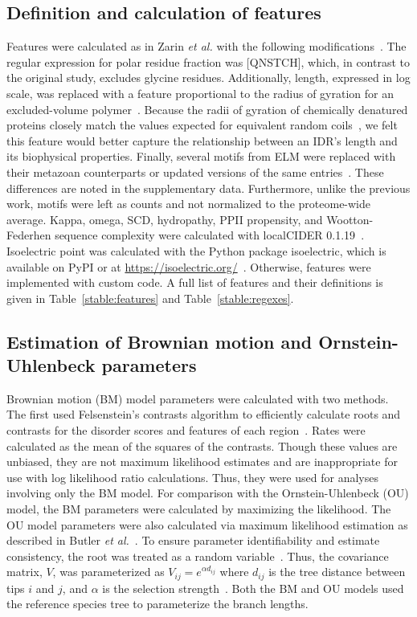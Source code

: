 \subsection{Definition and calculation of features}
Features were calculated as in Zarin \textit{et al.} with the following modifications~\cite{Zarin2019}. The regular expression for polar residue fraction was [QNSTCH], which, in contrast to the original study, excludes glycine residues. Additionally, length, expressed in log scale, was replaced with a feature proportional to the radius of gyration for an excluded-volume polymer~\cite{Flory1949}. Because the radii of gyration of chemically denatured proteins closely match the values expected for equivalent random coils~\cite{Kohn2004}, we felt this feature would better capture the relationship between an IDR's length and its biophysical properties. Finally, several motifs from ELM were replaced with their metazoan counterparts or updated versions of the same entries~\cite{Kumar2021}. These differences are noted in the supplementary data. Furthermore, unlike the previous work, motifs were left as counts and not normalized to the proteome-wide average. Kappa, omega, SCD, hydropathy, PPII propensity, and Wootton-Federhen sequence complexity were calculated with localCIDER 0.1.19~\cite{Holehouse2017}. Isoelectric point was calculated with the Python package isoelectric, which is available on PyPI or at \url{https://isoelectric.org/}~\cite{Kozlowski2016}. Otherwise, features were implemented with custom code. A full list of features and their definitions is given in Table~\ref{stable:features} and Table~\ref{stable:regexes}.

\subsection{Estimation of Brownian motion and Ornstein-Uhlenbeck parameters}
Brownian motion (BM) model parameters were calculated with two methods. The first used Felsenstein's contrasts algorithm to efficiently calculate roots and contrasts for the disorder scores and features of each region~\cite{Felsenstein1973, Felsenstein1985}. Rates were calculated as the mean of the squares of the contrasts. Though these values are unbiased, they are not maximum likelihood estimates and are inappropriate for use with log likelihood ratio calculations. Thus, they were used for analyses involving only the BM model. For comparison with the Ornstein-Uhlenbeck (OU) model, the BM parameters were calculated by maximizing the likelihood. The OU model parameters were also calculated via maximum likelihood estimation as described in Butler \textit{et al.}~\cite{Butler2004}. To ensure parameter identifiability and estimate consistency, the root was treated as a random variable~\cite{Ho2013, Ho2014}. Thus, the covariance matrix, $V$, was parameterized as $V_{ij} = e^{\alpha d_{ij}}$ where $d_{ij}$ is the tree distance between tips $i$ and $j$, and $\alpha$ is the selection strength~\cite{Ho2013}. Both the BM and OU models used the reference species tree to parameterize the branch lengths.

